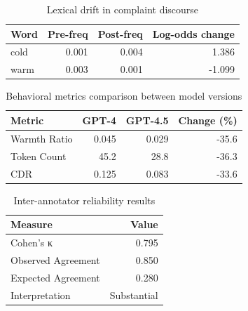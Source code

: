 \begin{table}[htbp]
\centering
\begin{tabular}{lrrr}
\toprule
Word & Pre-freq & Post-freq & Log-odds change \\
\midrule
cold & 0.001 & 0.004 & 1.386 \\
warm & 0.003 & 0.001 & -1.099 \\
\bottomrule
\end{tabular}
\caption{Lexical drift in complaint discourse}
\label{tab:drift}
\end{table}

\begin{table}[htbp]
\centering
\begin{tabular}{lrrr}
\toprule
Metric & GPT-4 & GPT-4.5 & Change (\%) \\
\midrule
Warmth Ratio & 0.045 & 0.029 & -35.6 \\
Token Count & 45.2 & 28.8 & -36.3 \\
CDR & 0.125 & 0.083 & -33.6 \\
\bottomrule
\end{tabular}
\caption{Behavioral metrics comparison between model versions}
\label{tab:probes}
\end{table}

\begin{table}[htbp]
\centering
\begin{tabular}{lr}
\toprule
Measure & Value \\
\midrule
Cohen's κ & 0.795 \\
Observed Agreement & 0.850 \\
Expected Agreement & 0.280 \\
Interpretation & Substantial \\
\bottomrule
\end{tabular}
\caption{Inter-annotator reliability results}
\label{tab:reliability}
\end{table}

